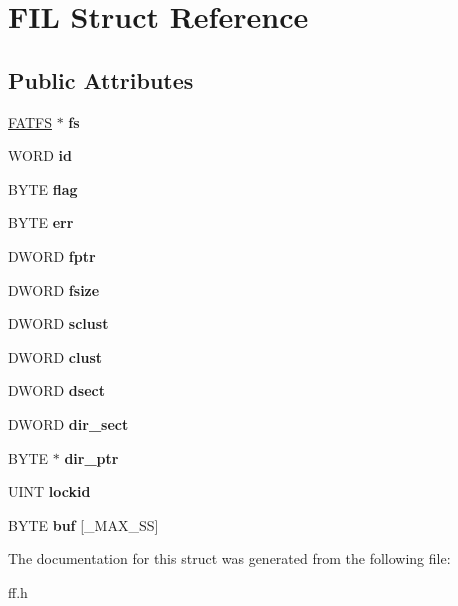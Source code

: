 \hypertarget{struct_f_i_l}{}\section{F\+IL Struct Reference}
\label{struct_f_i_l}
\subsection*{Public Attributes}
\begin{DoxyCompactItemize}
\item 
\mbox{\label{struct_f_i_l_a42376a6797a06228911c8b836c1e9030}} 
\hyperlink{struct_f_a_t_f_s}{F\+A\+T\+FS} $\ast$ {\bfseries fs}
\item 
\mbox{\label{struct_f_i_l_af7cae0063b0045fb7078b560101ba8f2}} 
W\+O\+RD {\bfseries id}
\item 
\mbox{\label{struct_f_i_l_ac409508881f5a16f2998ae675072b376}} 
B\+Y\+TE {\bfseries flag}
\item 
\mbox{\label{struct_f_i_l_aea440945db26de9c4a88065c0c887fda}} 
B\+Y\+TE {\bfseries err}
\item 
\mbox{\label{struct_f_i_l_a75d29cf9257c827d117887b9f924c4a9}} 
D\+W\+O\+RD {\bfseries fptr}
\item 
\mbox{\label{struct_f_i_l_aa00790d40d7b0081c345fd4f76e22b70}} 
D\+W\+O\+RD {\bfseries fsize}
\item 
\mbox{\label{struct_f_i_l_ad308b74c8d6975c6a9c30d90b4124c40}} 
D\+W\+O\+RD {\bfseries sclust}
\item 
\mbox{\label{struct_f_i_l_aa41312aba551b9a6d1c9d3c8c7d2734b}} 
D\+W\+O\+RD {\bfseries clust}
\item 
\mbox{\label{struct_f_i_l_ab3d4165d6fd32ac71a130d835fbf0b4d}} 
D\+W\+O\+RD {\bfseries dsect}
\item 
\mbox{\label{struct_f_i_l_ab203794f939ad4480e81dfa488770783}} 
D\+W\+O\+RD {\bfseries dir\+\_\+sect}
\item 
\mbox{\label{struct_f_i_l_a5af9e9fb312b629220eaf684dd28c4a9}} 
B\+Y\+TE $\ast$ {\bfseries dir\+\_\+ptr}
\item 
\mbox{\label{struct_f_i_l_a9488efc484439c0d4d7a9b65ab80f16d}} 
U\+I\+NT {\bfseries lockid}
\item 
\mbox{\label{struct_f_i_l_a7a95fb86588663e48309b5cded7e207b}} 
B\+Y\+TE {\bfseries buf} \mbox{[}\+\_\+\+M\+A\+X\+\_\+\+SS\mbox{]}
\end{DoxyCompactItemize}


The documentation for this struct was generated from the following file\+:\begin{DoxyCompactItemize}
\item 
ff.\+h\end{DoxyCompactItemize}
